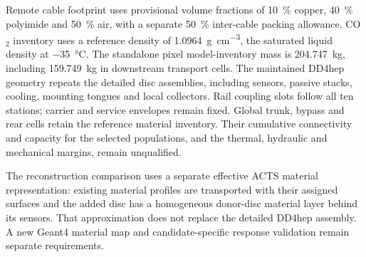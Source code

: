 Remote cable footprint uses provisional volume fractions of
\qty{10}{\percent} copper, \qty{40}{\percent} polyimide and
\qty{50}{\percent} air, with a separate \qty{50}{\percent} inter-cable
packing allowance. CO$_2$ inventory uses a reference density of
\qty{1.0964}{\gram\per\centi\metre\cubed}, the saturated liquid density
at \qty{-35}{\degreeCelsius}.\cite{nistco2} The standalone pixel model-inventory mass is
\qty{204.747}{\kilogram}, including \qty{159.749}{\kilogram} in downstream
transport cells. The maintained DD4hep geometry repeats the detailed disc assemblies, including
sensors, passive stacks, cooling, mounting tongues and local collectors. Rail
coupling slots follow all ten stations; carrier and service envelopes remain
fixed. Global trunk, bypass and rear cells retain the reference material
inventory. Their cumulative connectivity and capacity for the selected
populations, and the thermal, hydraulic and mechanical margins, remain
unqualified.

The reconstruction comparison uses a separate effective ACTS material
representation: existing material profiles are transported with their assigned
surfaces and the added disc has a homogeneous donor-disc material layer behind
its sensors. That approximation does not replace the detailed DD4hep assembly.
A new Geant4 material map and candidate-specific response validation remain
separate requirements.

\clearpage

